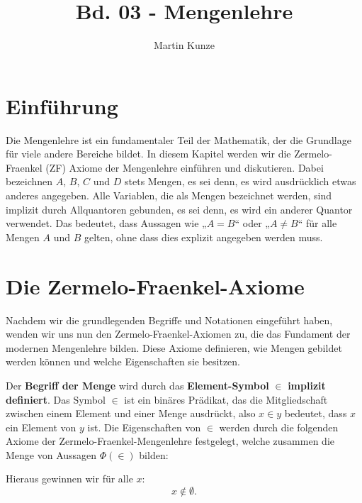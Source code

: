 \documentclass[main.tex]{subfiles}
\title{Bd. 03 - Mengenlehre}
\author{Martin Kunze}
\date{}
\begin{document}
\maketitle
\tableofcontents

\setcounter{file}{2}

\chapter{Einführung}

Die Mengenlehre ist ein fundamentaler Teil der Mathematik, der die Grundlage für viele andere Bereiche bildet. In diesem Kapitel werden wir die Zermelo-Fraenkel (ZF) Axiome der Mengenlehre einführen und diskutieren. Dabei bezeichnen \( A \), \( B \), \( C \) und \( D \) stets Mengen, es sei denn, es wird ausdrücklich etwas anderes angegeben. Alle Variablen, die als Mengen bezeichnet werden, sind implizit durch Allquantoren gebunden, es sei denn, es wird ein anderer Quantor verwendet. Das bedeutet, dass Aussagen wie „\( A = B \)“ oder „\( A \neq B \)“ für alle Mengen \( A \) und \( B \) gelten, ohne dass dies explizit angegeben werden muss.

\chapter{Die Zermelo-Fraenkel-Axiome}
Nachdem wir die grundlegenden Begriffe und Notationen eingeführt haben, wenden wir uns nun den Zermelo-Fraenkel-Axiomen zu, die das Fundament der modernen Mengenlehre bilden. Diese Axiome definieren, wie Mengen gebildet werden können und welche Eigenschaften sie besitzen.
\begin{definition}
Der \textbf{Begriff der Menge} wird durch das \textbf{Element-Symbol} \(\in\) \textbf{implizit definiert}. 
Das Symbol \(\in\) ist ein binäres Prädikat, das die Mitgliedschaft zwischen einem Element und einer Menge 
ausdrückt, also \(x \in y\) bedeutet, dass \(x\) ein Element von \(y\) ist. Die Eigenschaften von \(\in\) 
werden durch die folgenden Axiome der Zermelo-Fraenkel-Mengenlehre festgelegt, welche zusammen die Menge von 
Aussagen \(\Phi(\in)\) bilden:
\end{definition}



\begin{remark}
    Hieraus gewinnen wir für alle \(x\):
    \[
    x \not\in \emptyset.
    \]
\end{remark}
\end{document}
